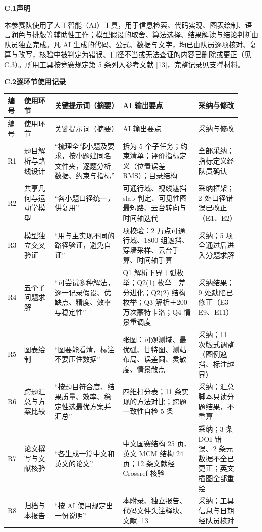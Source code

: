 \documentclass[UTF8,a4paper,zihao=-4,oneside]{ctexart}
\begin{document}
{\footnotesize
\setlength{\tabcolsep}{2.5pt}
\renewcommand{\arraystretch}{1.06}
\noindent\textbf{C.1\quad 声明}

本参赛队使用了人工智能（AI）工具，用于信息检索、代码实现、图表绘制、语言润色与排版等辅助性工作；模型假设的取舍、算法选择、结果解读与结论判断由队员独立完成。凡 AI 生成的代码、公式、数据与文字，均已由队员逐项核对、复算与改写，核验中被判定为错误、口径不当或无法查证的内容已删除或更正（见 C.3）。所用工具按竞赛规定第 5 条列入参考文献 [13]，完整记录见支撑材料。

\vspace{4pt}
\noindent\textbf{C.2\quad 逐环节使用记录}

\begin{longtable}{@{}>{\raggedright\arraybackslash}p{0.045\linewidth}
                 >{\raggedright\arraybackslash}p{0.125\linewidth}
                 >{\raggedright\arraybackslash}p{0.27\linewidth}
                 >{\raggedright\arraybackslash}p{0.30\linewidth}
                 >{\raggedright\arraybackslash}p{0.175\linewidth}@{}}
\toprule
编号 & 使用环节 & 关键提示词（摘要） & AI 输出要点 & 采纳与修改 \\
\midrule
\endfirsthead
\toprule
编号 & 使用环节 & 关键提示词（摘要） & AI 输出要点 & 采纳与修改 \\
\midrule
\endhead
\bottomrule
\endlastfoot
R1 & 题目解析与路线设计 & “梳理全部小题及要求，按小题建同名文件夹，逐题分析数据、约束与指标” & 拆为 5 个子任务；约束清单；评价指标定义（位置误差 RMS）；目录结构 & 全部采纳；指标定义经队员确认 \\
R2 & 共享几何与运动学模型 & “各小题口径统一，供复用” & 可通行域、视线遮挡 slab 判定、可见性图最短路、云台转向与时间轴迭代 & 采纳框架；2 处口径错误已改正（E1、E2） \\
R3 & 模型独立交叉验证 & “用与主实现不同的路径验证，避免自证” & 5 项校验：2 万点可通行域、1800 组遮挡、穿墙采样、云台手算、时间轴手算 & 采纳；5 项全通过后进入分题求解 \\
R4 & 五个子问题求解 & “可尝试多种解法，逐一记录假设、优缺点、精度、效率与稳定性” & Q1 解析下界＋弧枚举；Q2(1) 枚举＋差分进化；Q2(2) 结构枚举；Q3 解析＋200 万次蒙特卡洛；Q4 情景重调度 & 采纳结果；9 处缺陷已修正（E3--E9、E11） \\
R5 & 图表绘制 & “图要能看清，标注不要压住数据” & 12 张图：可观测域、最优弧、甘特图、测站布局、误差圆、灵敏度、情景散点 & 采纳；11 次版式调整（图例遮挡、标注越界） \\
R6 & 跨题汇总与方案比较 & “按题目符合度、结果质量、效率、稳定性选最优方案并汇总” & 四维打分表；11 条实现的方法对比；跨题一致性自检 5 条 & 采纳；汇总脚本只读分题结果，不重算 \\
R7 & 论文撰写与文献核验 & “各生成一篇中文和英文的论文” & 中文国赛结构 25 页、英文 MCM 结构 24 页；12 条文献经 Crossref 核验 & 采纳；3 条 DOI 错误、2 条元数据不全已更正；英文插图全部重绘 \\
R8 & 归档与本报告 & “按 AI 使用规定出一份说明” & 本附录、独立报告、代码文件头注释块、文献 [13] & 采纳；工具信息与日期经队员核对 \\
\end{longtable}

}
\end{document}
